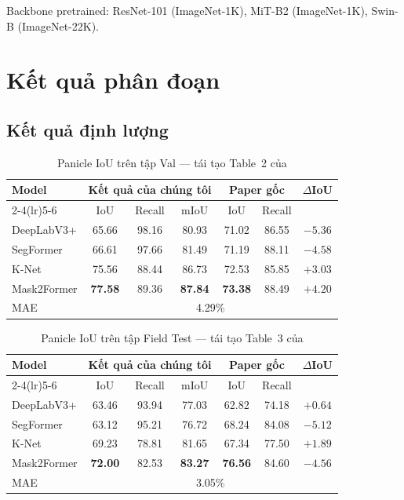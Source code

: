 \documentclass[12pt, a4paper]{article}
\begin{document}
Backbone pretrained: ResNet-101 (ImageNet-1K), MiT-B2 (ImageNet-1K), Swin-B (ImageNet-22K).

\section{Kết quả phân đoạn}
\label{sec:results}

\subsection{Kết quả định lượng}

\begin{table}[H]
\centering
\caption{Panicle IoU trên tập Val --- tái tạo Table~2 của \cite{tang2025cvrp}}
\label{tab:results_val}
\begin{tabular}{lcccccc}
\toprule
\multirow{2}{*}{\textbf{Model}} &
\multicolumn{3}{c}{\textbf{Kết quả của chúng tôi}} &
\multicolumn{2}{c}{\textbf{Paper gốc}} &
\multirow{2}{*}{$\Delta$IoU} \\
\cmidrule(lr){2-4}\cmidrule(lr){5-6}
 & IoU & Recall & mIoU & IoU & Recall & \\
\midrule
{\color{colorDL}DeepLabV3+}  & 65.66 & 98.16 & 80.93 & 71.02 & 86.55 & $-5.36$ \\
{\color{colorSF}SegFormer}    & 66.61 & 97.66 & 81.49 & 71.19 & 88.11 & $-4.58$ \\
{\color{colorKN}K-Net}        & 75.56 & 88.44 & 86.73 & 72.53 & 85.85 & $\mathbf{+3.03}$ \\
{\color{colorM2F}Mask2Former} & \textbf{77.58} & 89.36 & \textbf{87.84} & \textbf{73.38} & 88.49 & $\mathbf{+4.20}$ \\
\midrule
MAE & \multicolumn{6}{c}{4.29\%} \\
\bottomrule
\end{tabular}
\end{table}

\begin{table}[H]
\centering
\caption{Panicle IoU trên tập Field Test --- tái tạo Table~3 của \cite{tang2025cvrp}}
\label{tab:results_field}
\begin{tabular}{lcccccc}
\toprule
\multirow{2}{*}{\textbf{Model}} &
\multicolumn{3}{c}{\textbf{Kết quả của chúng tôi}} &
\multicolumn{2}{c}{\textbf{Paper gốc}} &
\multirow{2}{*}{$\Delta$IoU} \\
\cmidrule(lr){2-4}\cmidrule(lr){5-6}
 & IoU & Recall & mIoU & IoU & Recall & \\
\midrule
{\color{colorDL}DeepLabV3+}  & 63.46 & 93.94 & 77.03 & 62.82 & 74.18 & $+0.64$ \\
{\color{colorSF}SegFormer}    & 63.12 & 95.21 & 76.72 & 68.24 & 84.08 & $-5.12$ \\
{\color{colorKN}K-Net}        & 69.23 & 78.81 & 81.65 & 67.34 & 77.50 & $+1.89$ \\
{\color{colorM2F}Mask2Former} & \textbf{72.00} & 82.53 & \textbf{83.27} & \textbf{76.56} & 84.60 & $-4.56$ \\
\midrule
MAE & \multicolumn{6}{c}{3.05\%} \\
\bottomrule
\end{tabular}
\end{table}
\end{document}
